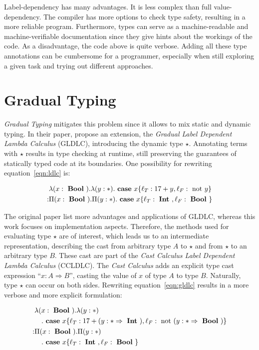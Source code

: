 Label-dependency has many advantages. It is less complex than full value-dependency. The compiler has more options to check type safety, resulting in a more reliable program. Furthermore, types can serve as a machine-readable and machine-verifiable documentation since they give hints about the workings of the code.
As a disadvantage, the code above is quite verbose. Adding all these type annotations can be cumbersome for a programmer, especially when still exploring a given task and trying out different approaches.

\section{Gradual Typing}

\emph{Gradual Typing} mitigates this problem since it allows to mix static and dynamic typing. In their paper, \cite{fu2021} propose an extension, the \emph{Gradual Label Dependent Lambda Calculus} (GLDLC), introducing the dynamic type $\star$. Annotating terms with $\star$ results in type checking at runtime, still preserving the guarantees of statically typed code at its boundaries. One possibility for rewriting equation~\ref{eqn:ldlc} is:

\begin{equation}\label{eqn:gldlc}
\begin{split}
&\lambda (x: \text{ \textbf{Bool} })
. \lambda (y: \ast)
. \text{ \textbf{case} } x \{\ell_T: 17+y,\ell_F: \text{ not } y\} \\
: & \Pi(x : \text{ \textbf{Bool} })
. \Pi (y: \ast)
. \text{ \textbf{case} } x \{\ell_T: \text{ \textbf{Int} }, \ell_F: \text{ \textbf{Bool} } \}
\end{split}
\end{equation}

The original paper list more advantages and applications of GLDLC, whereas this work focuses on implementation aspects. Therefore, the methods used for evaluating type $\star$ are of interest, which leads us to an intermediate representation, describing the cast from arbitrary type $A$ to $\star$ and from $\star$ to an arbitrary type $B$. These cast are part of the \emph{Cast Calculus Label Dependent Lambda Calculus} (CCLDLC). The \emph{Cast Calculus} adds an explicit type cast expression ``$x : A \Rightarrow B$'', casting the value of $x$ of type $A$ to type $B$. Naturally, type $\star$ can occur on both sides. Rewriting equation~\ref{eqn:gldlc} results in a more verbose and more explicit formulation:

\begin{equation}\label{eqn:ccldlc}
\begin{split}
&\lambda (x: \text{ \textbf{Bool} }) . \lambda (y: \ast ) \\
&\quad . \text{ \textbf{case} } x \{\ell_T: 17+(y:\ast \Rightarrow \text{ \textbf{Int} }),\ell_F: \text{ not } (y:\ast \Rightarrow \text{ \textbf{Bool} })\} \\
: & \Pi(x : \text{ \textbf{Bool} }) . \Pi (y: \ast ) \\
&\quad . \text{ \textbf{case} } x \{\ell_T: \text{ \textbf{Int} }, \ell_F: \text{ \textbf{Bool} } \}
\end{split}
\end{equation}

